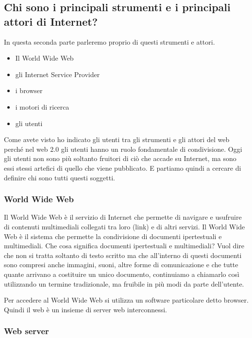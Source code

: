 \subsection{Chi sono i principali strumenti e i principali attori di Internet?}

In questa seconda parte parleremo proprio di questi strumenti e attori. \par

\begin{itemize}
    \item Il World Wide Web
    \item gli Internet Service Provider
    \item i browser
    \item i motori di ricerca
    \item gli utenti
\end{itemize}

Come avete visto ho indicato gli utenti tra gli strumenti e gli attori del web perché nel web 2.0 gli utenti hanno un ruolo fondamentale di condivisione. Oggi gli utenti non sono più soltanto fruitori di ciò che accade su Internet, ma sono essi stessi artefici di quello che viene pubblicato. E partiamo quindi a cercare di definire chi sono tutti questi soggetti.

\subsubsection{World Wide Web}

Il  World Wide Web è il servizio di Internet che permette di navigare e usufruire di contenuti multimediali collegati tra loro (link) e di altri servizi. Il World Wide Web è il sistema che permette la condivisione di documenti ipertestuali e multimediali. 
Che cosa significa documenti ipertestuali e multimediali? 
Vuol dire che non si tratta soltanto di testo scritto ma che all'interno di questi documenti sono compresi anche immagini, suoni, altre forme di comunicazione e che tutte quante arrivano a costituire un unico documento, continuiamo a chiamarlo così utilizzando un termine tradizionale, ma fruibile in più modi da parte dell'utente.

Per accedere al World Wide Web si utilizza un software particolare detto browser. Quindi il web è un insieme di server web interconnessi.

\subsubsection{Web server}

